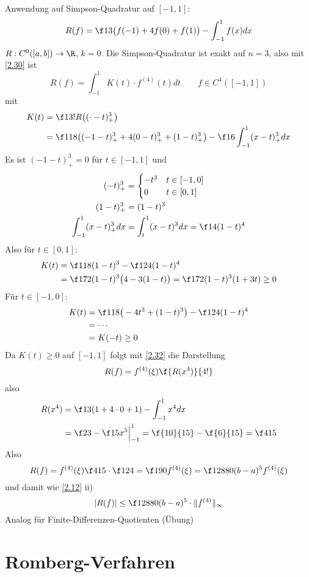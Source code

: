 \documentclass[11pt]{scrbook}
\begin{document}
\begin{ex*}
	Anwendung auf Simpson-Quadratur auf $[-1,1]$:
	\[
		R(f) = \f 13 \big(f(-1) + 4f(0) + f(1)\big) -\int_{-1}^1 f(x) dx
	\]
	$R: C^0 ([a,b]) \to \R$, $k=0$.
	Die Simpson-Quadratur ist exakt auf $n=3$, also mit \ref{2.30} ist
	\[
		R(f) = \int_{-1}^1 K(t) \cdot f^{(4)}(t) dt \qquad f\in C^4([-1,1])
	\]
	mit
	\begin{align*}
		K(t) &= \f 1{3!}R \big((\cdot - t)_+^3\big) \\
		&= \f 1{18} \big((-1-t)_+^3+ 4(0-t)_+^3 + (1-t)_+^3 \big) - \f 16 \int_{-1}^1 (x-t)_+^3 dx \\
	\end{align*}
	Es ist $(-1-t)_+^3 = 0$ für $t\in [-1,1]$ und
	\begin{align*}
		(-t)_+^3 &= \begin{cases}
			-t^3 & t\in[-1,0] \\
			0 & t\in[0,1]
		\end{cases} \\
		(1-t)_+^3 &= (1-t)^3 \\
		\int_{-1}^1 (x-t)_+^3 dx &= \int_t^1 (x-t)^3 dx = \f 14(1-t)^4
	\end{align*}
	Also für $t\in [0,1]$:
	\begin{align*}
		K(t) &= \f 1{18} (1-t)^3 - \f 1{24} (1-t)^4 \\
			&= \f 1{72}(1-t)^3\big(4-3(1-t)\big) = \f 1{72}(1-t)^3(1+3t) \ge 0
	\end{align*}
	Für $t\in [-1,0]$:
	\begin{align*}
		K(t) &= \f 1{18}\big(-4t^3 + (1-t)^3\big) - \f 1{24}(1-t)^4 \\
		&=  \dotsb \\
		&= K(-t) \ge 0
	\end{align*}
	Da $K(t) \ge 0$ auf $[-1,1]$ folgt mit \ref{2.32} die Darstellung
	\[
		R(f) = f^{(4)}(\xi) \f {R(x^4)}{4!}
	\]
	also
	\begin{align*}
		R(x^4) &= \f 13 (1+4\cdot 0 + 1) - \int_{-1}^1 x^4 dx \\
		&= \f 23 - \f 15 x^5 \Big|_{-1}^1
		= \f {10}{15} - \f {6}{15} = \f 4{15}
	\end{align*}
	Also
	\[
		R(f) = f^{(4)}(\xi) \f 4{15} \cdot \f 1{24} 
		= \f 1{90} f^{(4)}(\xi) 
		= \f 1{2880} (b-a)^5 f^{(4)}(\xi)
	\]
	und damit wie \ref{2.12} ii)
	\[
		|R(f)| \le \f 1{2880} (b-a)^5 \cdot \|f^{(4)}\|_\infty
	\]
	Analog für Finite-Differenzen-Quotienten (Übung)
\end{ex*}


\section{Romberg-Verfahren}
\end{document}
